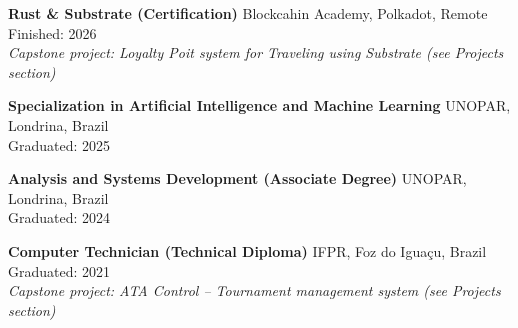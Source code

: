 
\textbf{Rust \& Substrate (Certification)} \hfill Blockcahin Academy, Polkadot, Remote \\
Finished: 2026 \\
\textit{Capstone project: Loyalty Poit system for Traveling using Substrate (see Projects section)}

\textbf{Specialization in Artificial Intelligence and Machine Learning} \hfill UNOPAR, Londrina, Brazil \\
Graduated: 2025

\textbf{Analysis and Systems Development (Associate Degree)} \hfill UNOPAR, Londrina, Brazil \\
Graduated: 2024

\textbf{Computer Technician (Technical Diploma)} \hfill IFPR, Foz do Iguaçu, Brazil \\
Graduated: 2021 \\
\textit{Capstone project: ATA Control – Tournament management system (see Projects section)}
